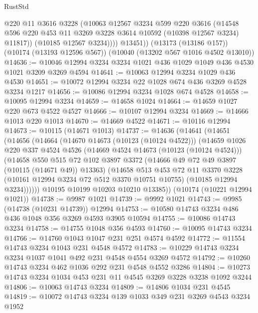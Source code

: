 \begin{lexlean}{RustStd}
\begin{coremodule}
              @220
              @11
              @3616
              @3228
              (@10063
                @12567
                @3234
                @599
                @220
                @3616
                (@14548 @596 @220 @453 @11 @3269 @3228 @3614 @10592 (@10398 @12567 @3234) @11817))
              (@10185 @12567 @3234))))
        @13451))
    (@13173 (@13186 @157))
    (@10174 (@13193 @12596 @567))
    (@10040 (@13202 @567 @1016 @4502 @13010))
@14636 := @10046 @12994 @3234 @3234 @1021 @436 @1029 @1049 @436 @4530 @1021 @3209 @3269 @4594
@14641 := @10063 @12994 @3234 @1029 @436 @4530
@14651 := @10072 @12994 @3234 @22 @1028 @674 @436 @3269 @4528 @3234 @1217
@14656 := @10086 @12994 @3234 @1028 @674 @4528
@14658 := @10095 @12994 @3234
@14659 := @14658 @1024
@14664 := @14659 @1027 @220 @673 @4522 @4527
@14666 := @10107 @12994 @3234
@14669 := @14666 @1013 @220 @1013
@14670 := @14669 @4522
@14671 := @10116 @12994
@14673 := @10115 (@14671 @1013)
@14737 := @14636
    (@14641
      (@14651
        (@14656
          (@14664
            (@14670 @14673 (@10123 (@10124 @4522)))
            (@14659
              @1026
              @220
              @337
              @4524
              @4526
              (@14669 @4524 @14673 (@10123 (@10124 @4524)))
              (@14658
                @550
                @515
                @72
                @102
                @3897
                @3372
                (@14666 @49 @72 @49 @3897 (@10115 (@14671 @49)) @13363)
                (@14658
                  @513
                  @453
                  @72
                  @11
                  @3370
                  @3228
                  (@10161 @12994 @3234 @72 @512 @3370 @10751 @10755)
                  (@10185 @12994 @3234))))))
        @10195
        @10199
        @10203
        @10210
        @13385))
    (@10174 (@10221 @12994 @1021))
@14738 := @9987 @1021
@14739 := @9992 @1021
@14743 := @9985 (@14738 (@10231 @14739)) @12994
@14753 := @10580 @14743 @3234 @486 @436 @1048 @356 @3269 @4593 @3905 @10594
@14755 := @10086 @14743 @3234
@14758 := @14755 @1048 @356 @4593
@14760 := @10095 @14743 @3234
@14766 := @14760 @1043 @1047 @231 @251 @4574 @4592
@14772 := @11554 @14743 @3234 @1043 @231 @4548 @4572
@14783 := @10229 @14743 @3234 @3234 @1037 @1041 @492 @231 @4548 @4554 @3269 @4572
@14792 := @10260 @14743 @3234 @462 @1036 @292 @231 @4548 @4552 @3286
@14804 := @10273 @14743 @3234 @1034 @453 @231 @11 @4545 @3269 @3228 @3238 @1092 @3244
@14806 := @10063 @14743 @3234
@14809 := @14806 @1034 @231 @4545
@14819 := @10072 @14743 @3234 @139 @1033 @349 @231 @3269 @4543 @3234 @1952

\end{coremodule}
\end{lexlean}
